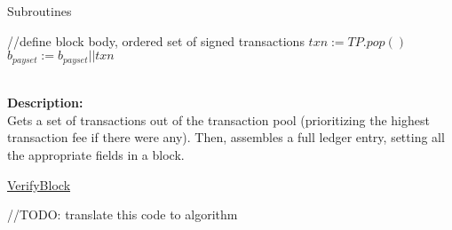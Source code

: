 \documentclass[10pt,a4paper]{article}
\begin{document}
\begin{section}{Subroutines}
\begin{algorithm}[H]
\begin{algorithmic}[1]
    //define block body, ordered set of signed transactions
        \State $txn := TP.pop()$
            \State $b_{payset} :=  b_{payset}||txn$ \\ \\
        \EndIf
    \EndWhile

    \EndFunction
    \end{algorithmic}
\end{algorithm}

\noindent \textbf{Description:}\\
Gets a set of transactions out of the transaction pool (prioritizing the highest transaction fee if there were any).
Then, assembles a full ledger entry, setting all the appropriate fields in a block.


\begin{algorithm}[H]
    \caption{\underline{VerifyBlock}}    
    \label{algo:verify-block}
    \begin{algorithmic}[1]


    


    //TODO: translate this code to algorithm
    \EndIf






\end{algorithmic}
\end{algorithm}
\end{section}
\end{document}
